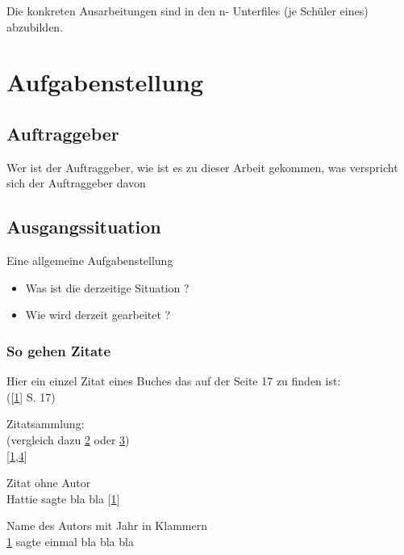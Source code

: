 \documentclass[
    headings=optiontotocandhead,%
    twoside,
    numbers=noenddot,%
    12pt, %
    titlepage, %
    parskip=full, %
    listof=leveldown, 
    numbers=noenddot, %
    a4paper,DIV=14,
    BCOR=15mm,
]{scrbook}
\makeatletter
\newcommand*{\the@orig@section}{}
\let\the@orig@section\section
\renewcommand*{\section}{%
  \clearpage
  \the@orig@section
}
\providecommand{\tightlist}{%
  \setlength{\itemsep}{0pt}\setlength{\parskip}{0pt}}
\makeatother
\begin{document}
Die konkreten Ausarbeitungen sind in den n- Unterfiles (je Schüler
eines) abzubilden.

\hypertarget{aufgabenstellung}{%
\section{Aufgabenstellung}\label{aufgabenstellung}}

\hypertarget{auftraggeber}{%
\subsection{Auftraggeber}\label{auftraggeber}}

Wer ist der Auftraggeber, wie ist es zu dieser Arbeit gekommen, was
verspricht sich der Auftraggeber davon

\hypertarget{ausgangssituation}{%
\subsection{Ausgangssituation}\label{ausgangssituation}}

Eine allgemeine Aufgabenstellung

\begin{itemize}
\tightlist
\item
  Was ist die derzeitige Situation ?
\item
  Wie wird derzeit gearbeitet ?
\end{itemize}

\hypertarget{so-gehen-zitate}{%
\subsubsection{So gehen Zitate}\label{so-gehen-zitate}}

Hier ein einzel Zitat eines Buches das auf der Seite 17 zu finden ist:\\
({[}\protect\hyperlink{ref-hattie_lernen_2013}{1}{]} S. 17)

Zitatsammlung:\\
(vergleich dazu \protect\hyperlink{ref-heise}{2} oder
\protect\hyperlink{ref-t3n}{3})\\
{[}\protect\hyperlink{ref-hattie_lernen_2013}{1},\protect\hyperlink{ref-leeb_einfuhrung_2016}{4}{]}

Zitat ohne Autor\\
Hattie sagte bla bla {[}\protect\hyperlink{ref-hattie_lernen_2013}{1}{]}

Name des Autors mit Jahr in Klammern\\
\protect\hyperlink{ref-hattie_lernen_2013}{1} sagte einmal bla bla bla
\end{document}
